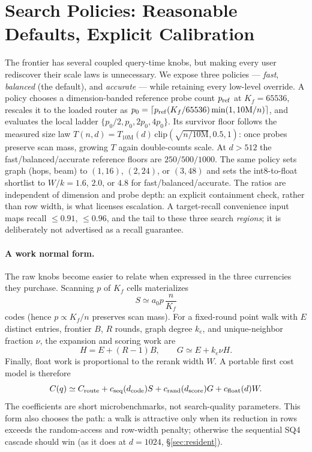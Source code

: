 \documentclass{article}
\begin{document}
\section{Search Policies: Reasonable Defaults, Explicit Calibration}
\label{sec:presets}
The frontier has several coupled query-time knobs, but making every user rediscover
their scale laws is unnecessary. We expose three policies --- \emph{fast},
\emph{balanced} (the default), and \emph{accurate} --- while retaining every
low-level override. A policy chooses a dimension-banded reference probe count
$p_{\rm ref}$ at $K_f{=}65536$, rescales it to the loaded router as
$p_0=\lceil p_{\rm ref}(K_f/65536)
\min(1,10\mathrm{M}/n)\rceil$, and evaluates the local ladder
$\{p_0/2,p_0,2p_0,4p_0\}$. Its survivor floor follows the measured size law
$T(n,d)=T_{10\mathrm{M}}(d)\,
\mathrm{clip}(\sqrt{n/10\mathrm{M}},0.5,1)$: once probes preserve scan mass,
growing $T$ again double-counts scale.  At $d{>}512$ the fast/balanced/accurate
reference floors are $250/500/1000$.
The same policy sets graph (hops, beam) to $(1,16)$, $(2,24)$, or $(3,48)$ and
sets the int8-to-float shortlist to $W/k=1.6$, $2.0$, or $4.8$ for
fast/balanced/accurate.  The ratios are independent of dimension and probe depth:
an explicit containment check, rather than row width, is what licenses escalation.
A target-recall convenience input maps recall ${\le}0.91$, ${\le}0.96$, and the
tail to these three search \emph{regions}; it is deliberately not advertised as
a recall guarantee.

\paragraph{A work normal form.} The raw knobs become easier to relate when
expressed in the three currencies they purchase.  Scanning $p$ of $K_f$ cells
materializes
\[
 S \simeq a_0p\,\frac{n}{K_f}
\]
codes (hence $p\propto K_f/n$ preserves scan mass).  For a fixed-round point walk
with $E$ distinct entries, frontier $B$, $R$ rounds, graph degree $k_e$, and
unique-neighbor fraction $\nu$, the expansion and scoring work are
\[
 H=E+(R-1)B,\qquad
 G\simeq E+k_e\nu H .
\]
Finally, float work is proportional to the rerank width $W$.  A portable first
cost model is therefore
\[
 C(q)\simeq C_{\rm route}
 +c_{\rm seq}(d_{\rm code})S
 +c_{\rm rand}(d_{\rm score})G
 +c_{\rm float}(d)W .
\]
The coefficients are short microbenchmarks, not search-quality parameters.
This form also chooses the path: a walk is attractive only when its reduction
in rows exceeds the random-access and row-width penalty; otherwise the
sequential SQ4 cascade should win (as it does at $d{=}1024$,
\S\ref{sec:resident}).
\end{document}
